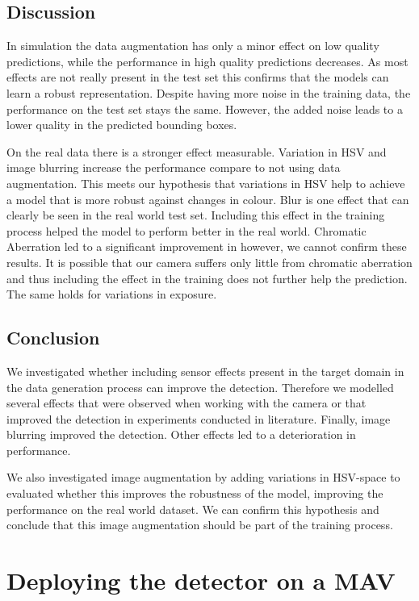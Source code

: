\subsection{Discussion}

In simulation the data augmentation has only a minor effect on low quality predictions, while the performance in high quality predictions decreases. As most effects are not really present in the test set this confirms that the models can learn a robust representation. Despite having more noise in the training data, the performance on the test set stays the same. However, the added noise leads to a lower quality in the predicted bounding boxes.

On the real data there is a stronger effect measurable. Variation in HSV and image blurring increase the performance compare to not using data augmentation. This meets our hypothesis that variations in HSV help to achieve a model that is more robust against changes in colour. Blur is one effect that can clearly be seen in the real world test set. Including this effect in the training process helped the model to perform better in the real world. Chromatic Aberration led to a significant improvement in \cite{Carlson2018} however, we cannot confirm these results. It is possible that our camera suffers only little from  chromatic aberration and thus including the effect in the training does not further help the prediction. The same holds for variations in exposure. 

\subsection{Conclusion}

We investigated whether including sensor effects present in the target domain in the data generation process can improve the detection. Therefore we modelled several effects that were observed when working with the camera or that improved the detection in experiments conducted in literature. Finally, image blurring improved the detection. Other effects led to a deterioration in performance.

We also investigated image augmentation by adding variations in HSV-space to evaluated whether this improves the robustness of the model, improving the performance on the real world dataset. We can confirm this hypothesis and conclude that this image augmentation should be part of the training process.


\section{Deploying the detector on a \ac{MAV}}

